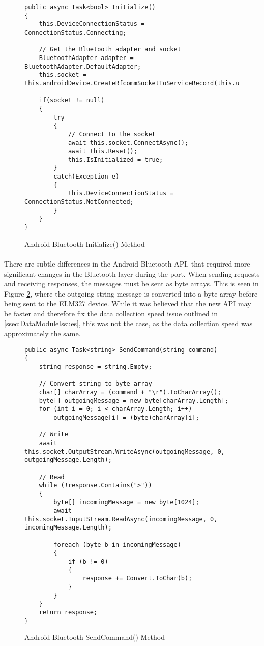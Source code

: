 		\begin{figure}[h]
			\begin{lstlisting}
public async Task<bool> Initialize()
{
	this.DeviceConnectionStatus = ConnectionStatus.Connecting;
	
	// Get the Bluetooth adapter and socket
    BluetoothAdapter adapter = BluetoothAdapter.DefaultAdapter;
	this.socket = this.androidDevice.CreateRfcommSocketToServiceRecord(this.uuid);
    
    if(socket != null)
	{
		try
		{
			// Connect to the socket
			await this.socket.ConnectAsync();                           
			await this.Reset();
			this.IsInitialized = true;
		}
		catch(Exception e)
		{
			this.DeviceConnectionStatus = ConnectionStatus.NotConnected;
		}                        
	}
}
			\end{lstlisting}
			\caption{Android Bluetooth Initialize() Method}
			\label{code:AndroidBluetoothInit}
		\end{figure}		

		\paragraph{}{
		There are subtle differences in the Android Bluetooth API, that required more significant changes in the Bluetooth layer during the port. When sending requests and receiving responses, the messages must be sent as byte arrays. This is seen in Figure \ref{code:AndroidBluetoothSend}, where the outgoing string message is converted into a byte array before being sent to the ELM327 device. While it was believed that the new API may be faster and therefore fix the data collection speed issue outlined in \ref{ssec:DataModuleIssues}, this was not the case, as the data collection speed was approximately the same.
		}

		\begin{figure}[h]
			\begin{lstlisting}
public async Task<string> SendCommand(string command)
{
    string response = string.Empty;

	// Convert string to byte array
	char[] charArray = (command + "\r").ToCharArray();
	byte[] outgoingMessage = new byte[charArray.Length];
	for (int i = 0; i < charArray.Length; i++)
		outgoingMessage[i] = (byte)charArray[i];

	// Write
	await this.socket.OutputStream.WriteAsync(outgoingMessage, 0, outgoingMessage.Length);

	// Read
	while (!response.Contains(">"))
	{
		byte[] incomingMessage = new byte[1024];
		await this.socket.InputStream.ReadAsync(incomingMessage, 0, incomingMessage.Length);

		foreach (byte b in incomingMessage)
		{
			if (b != 0)
			{
				response += Convert.ToChar(b);
			}
		}    
	}
	return response;
}
			\end{lstlisting}
			\caption{Android Bluetooth SendCommand() Method}
			\label{code:AndroidBluetoothSend}
		\end{figure}
		
